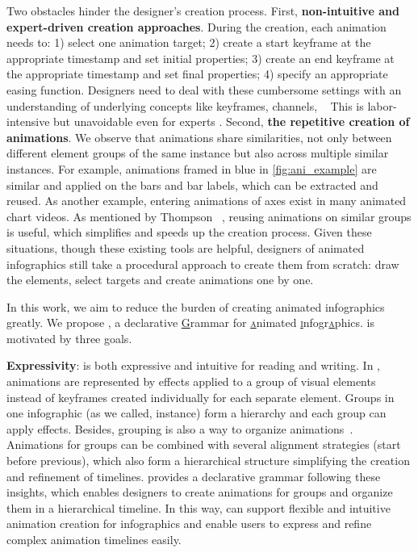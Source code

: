 
Two obstacles hinder the designer's creation process. 
First, \textbf{non-intuitive and expert-driven creation approaches}. %
During the creation, each animation needs to: 
1) select one animation target;
2) create a start keyframe at the appropriate timestamp and set initial properties;
3) create an end keyframe at the appropriate timestamp and set final properties;
4) specify an appropriate easing function.
Designers need to deal with these cumbersome settings with an understanding of underlying concepts like keyframes, channels, \etc~\cite{krasner2013motion, sarinastiti2016skill}
This is labor-intensive but unavoidable even for experts \cite{jahanlou2020challenges}.
Second, \textbf{the repetitive creation of animations}.
We observe that animations share similarities, not only between different element groups of the same instance but also across multiple similar instances.
For example, animations framed in blue in \autoref{fig:ani_example} are similar and applied on the bars and bar labels, which can be extracted and reused.
As another example, entering animations of axes exist in many animated chart videos.
As mentioned by Thompson \etal~\cite{thompson2020understanding}, reusing animations on similar groups is useful, which simplifies and speeds up the creation process.
Given these situations, though these existing tools are helpful, designers of animated infographics still take a procedural approach to create them from scratch: draw the elements, select targets and create animations one by one.

In this work, we aim to reduce the burden of creating animated infographics greatly. 
We propose \gaia{}, a declarative \underline{\textsc{G}}rammar for \underline{\textsc{a}}nimated \underline{\textsc{i}}nfogr\underline{\textsc{a}}phics. 
\gaia{} is motivated by three goals.

\textbf{Expressivity}: \gaia{} is both expressive and intuitive for reading and writing.
In \gaia{}, animations are represented by effects applied to a group of visual elements instead of keyframes created individually for each separate element.
Groups in one infographic (as we called, instance) form a hierarchy and each group can apply effects.
Besides, grouping is also a way to organize animations~\cite{thompson2020understanding}. Animations for groups can be combined with several alignment strategies (\eg start before previous), which also form a hierarchical structure simplifying the creation and refinement of timelines. 
\gaia{} provides a declarative grammar following these insights, which enables designers to create animations for groups and organize them in a hierarchical timeline.
In this way, \gaia{} can support flexible and intuitive animation creation for infographics and enable users to express and refine complex animation timelines easily.

